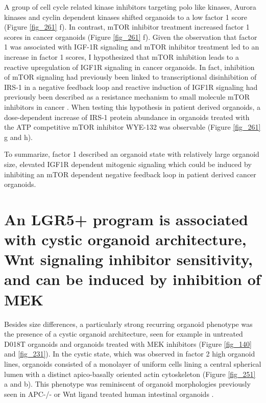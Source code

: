 \begin{flushleft}
\bigbreak
A group of cell cycle related kinase inhibitors targeting polo like kinases, Aurora kinases and cyclin dependent kinases shifted organoids to a low factor 1 score (Figure \ref{fig_261} f). In contrast, mTOR inhibitor treatment increased factor 1 scores in cancer organoids (Figure \ref{fig_261} f). Given the observation that factor 1 was associated with IGF-1R signaling and mTOR inhibitor treatment led to an increase in factor 1 scores, I hypothesized that mTOR inhibition leads to a reactive upregulation of IGF1R signaling in cancer organoids. In fact, inhibition of mTOR signaling had previously been linked to transcriptional disinhibition of IRS-1 in a negative feedback loop \cite{OReilly2006-fc} and  reactive induction of IGF1R signaling had previously been described as a resistance mechanism to small molecule mTOR inhibitors in cancer \cite{Sharma2010-qa}. When testing this hypothesis in patient derived organoids, a dose-dependent increase of IRS-1 protein abundance in organoids treated with the ATP competitive mTOR inhibitor WYE-132 was observable (Figure \ref{fig_261} g and h). 

\bigbreak
To summarize, factor 1 described an organoid state with relatively large organoid size, elevated IGF1R dependent mitogenic signaling which could be induced by inhibiting an mTOR dependent negative feedback loop in patient derived cancer organoids.

\newpage
\section{An LGR5+ program is associated with cystic organoid architecture, Wnt signaling inhibitor sensitivity, and can be induced by inhibition of MEK}

Besides size differences, a particularly strong recurring organoid phenotype was the presence of a cystic organoid architecture, seen for example in untreated D018T organoids and organoids treated with MEK inhibitors (Figure \ref{fig_140} and \ref{fig_231}). In the cystic state, which was observed in factor 2 high organoid lines, organoids consisted of a monolayer of uniform cells lining a central spherical lumen with a distinct apico-basally oriented actin cytoskeleton (Figure \ref{fig_251} a and b). This phenotype was reminiscent of organoid morphologies previously seen in APC-/- or Wnt ligand treated human intestinal organoids \cite{Matano2015-zw}. 


\end{flushleft}
